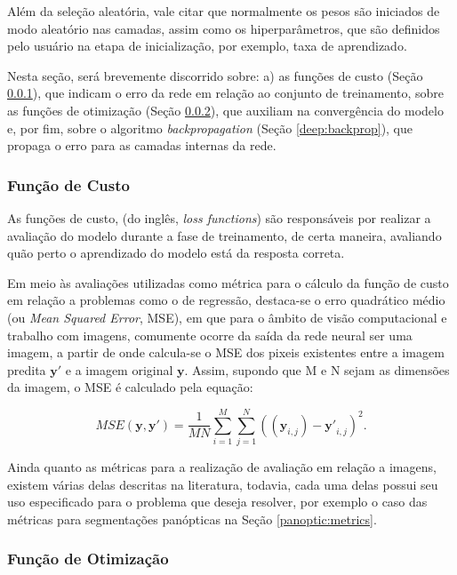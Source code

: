Além da seleção aleatória, vale citar que normalmente os pesos são iniciados de modo aleatório nas camadas, assim como os hiperparâmetros, que são definidos pelo usuário na etapa de inicialização, por exemplo, taxa de aprendizado.

Nesta seção, será brevemente discorrido sobre: a) as funções de custo (Seção \ref{deep:cust}), que indicam o erro da rede em relação ao conjunto de treinamento, sobre as funções de otimização (Seção \ref{deep:optimization}), que auxiliam na convergência do modelo e, por fim, sobre o algoritmo \textit{backpropagation} (Seção \ref{deep:backprop}), que propaga o erro para as camadas internas da rede.


\subsubsection{Função de Custo}
\label{deep:cust}

As funções de custo, (do inglês, \textit{loss functions}) são responsáveis por realizar a avaliação do modelo durante a fase de treinamento, de certa maneira, avaliando quão perto o aprendizado do modelo está da resposta correta.

Em meio às avaliações utilizadas como métrica para o cálculo da função de custo em relação a problemas como o de regressão, destaca-se o erro quadrático médio (ou \textit{Mean Squared Error}, MSE)\cite{Wang2004}, em que para o âmbito de visão computacional e trabalho com imagens, comumente ocorre da saída da rede neural ser uma imagem, a partir de onde calcula-se o MSE dos pixeis existentes entre a imagem predita $\boldsymbol{y'}$ e a imagem original $\boldsymbol{y}$. Assim, supondo que M e N sejam as dimensões da imagem, o MSE é calculado pela equação:

\begin{equation}
    \label{deep:eq:9}
    MSE(\boldsymbol{y}, \boldsymbol{y'}) = \frac{1}{MN} \sum_{i=1}^{M} \sum_{j=1}^{N} ((\boldsymbol{y}_{i,j}) - \boldsymbol{y'}_{i,j})^2.
\end{equation}

Ainda quanto as métricas para a realização de avaliação em relação a imagens, existem várias delas descritas na literatura, todavia,  cada uma delas possui seu uso especificado para o problema que deseja resolver, por exemplo o caso das métricas para segmentações panópticas na Seção \ref{panoptic:metrics}.


\subsubsection{Função de Otimização}
\label{deep:optimization}

